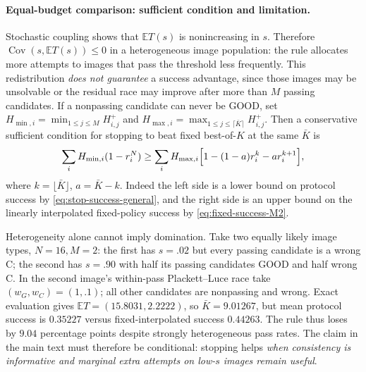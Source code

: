 \paragraph{Equal-budget comparison: sufficient condition and limitation.}
Stochastic coupling shows that $\mathbb ET(s)$ is nonincreasing in
$s$. Therefore $\operatorname{Cov}(s,\mathbb ET(s))\le0$ in a
heterogeneous image population: the rule allocates more attempts to
images that pass the threshold less frequently. This redistribution
\emph{does not guarantee} a success advantage, since those images may
be unsolvable or the residual race may improve after more than $M$
passing candidates. If a nonpassing candidate can never be GOOD,
set $H_{\min,i}=\min_{1\le j\le M}H_{i,j}^+$ and
$H_{\max,i}=\max_{1\le j\le\lceil\bar K\rceil}H_{i,j}^+$.
Then a conservative sufficient condition for stopping to beat fixed
best-of-$K$ at the same $\bar K$ is
\begin{equation}\label{eq:stop-sufficient}
 \sum_i H_{\min,i}(1-r_i^N)\ge
 \sum_i H_{\max,i}\Bigl[1-(1-a)r_i^k-a r_i^{k+1}\Bigr],
\end{equation}
where $k=\lfloor\bar K\rfloor$, $a=\bar K-k$.
Indeed the left side is a lower bound on protocol success by
\eqref{eq:stop-success-general}, and the right side is an upper bound
on the linearly interpolated fixed-policy success by
\eqref{eq:fixed-success-M2}.

Heterogeneity alone cannot imply domination. Take two equally likely
image types, $N=16,M=2$: the first has $s=.02$ but every passing
candidate is a wrong C; the second has $s=.90$ with half its passing
candidates GOOD and half wrong C. In the second image's within-pass
Plackett--Luce race take $(w_G,w_C)=(1,.1)$; all other candidates are
nonpassing and wrong. Exact evaluation gives
$\mathbb ET=(15.8031,2.2222)$, so $\bar K=9.01267$, but mean protocol
success is $0.35227$ versus fixed-interpolated success $0.44263$.
The rule thus loses by $9.04$ percentage points despite strongly
heterogeneous pass rates. The claim in the main text must therefore
be conditional: stopping helps \emph{when consistency is informative
and marginal extra attempts on low-$s$ images remain useful}.

